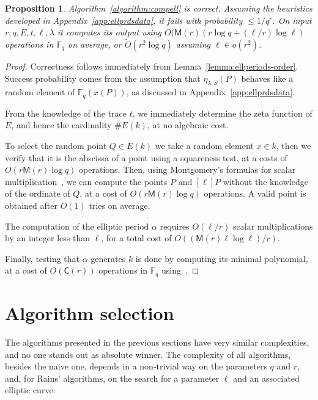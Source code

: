 \documentclass[12pt]{article}
\theoremstyle{plain}
\newtheorem{proposition}[theorem]{Proposition}
\theoremstyle{definition}
\newcommand{\tildO}{\tilde{O}}
\def\F{\ensuremath{\mathbb{F}}}
\def\MM{\ensuremath{\mathsf{M}}}
\def\CC{\ensuremath{\mathsf{C}}}
\newcounter{algorithm}
\begin{document}
\begin{proposition}
  Algorithm~\ref{algorithm:compell} is correct. Assuming the
  heuristics developed in Appendix~\ref{app:ellprdsdata}, it fails
  with probability $\le 1/q^r$.  On input
  $r,q,E,t,\ell,\lambda$ it computes its output using
  $O(\MM(r)(r\log{q} + (\ell/r)\log{\ell})$ operations in $\F_q$ on average, or
  $\tildO(r^2\log q)$ assuming $\ell\in o(r^2)$.
\end{proposition}
\begin{proof}
  Correctness follows immediately from
  Lemma~\ref{lemma:ellperiods-order}. Success probability comes from
  the assumption that $\eta_{\lambda,S}(P)$ behaves like a random element of
  $\F_q(x(P))$, as discussed in Appendix~\ref{app:ellprdsdata}.

  From the knowledge of the trace $t$, we immediately determine the
  zeta function of $E$, and hence the cardinality $\# E(k)$, at
  no algebraic cost.

  To select the random point $Q\in E(k)$ we take a random
  element $x\in k$, then we verify that it is the abscissa of a
  point using a squareness test, at a costs of $O(r\MM(r)\log q)$
  operations. Then, using Montgomery's formulas for scalar
  multiplication~\cite{montgomery}, we can compute the points $P$ and
  $[\ell]P$ without the knowledge of the ordinate of $Q$, at a cost of
  $O(r\MM(r)\log q)$ operations. A valid point is obtained after
  $O(1)$ tries on average.

  The computation of the elliptic period $\alpha$ requires $O(\ell/r)$ scalar
  multiplications by an integer less than $\ell$, for a total cost of
  $O((\MM(r)\ell\log\ell)/r)$.

  Finally, testing that $\alpha$ generates $k$ is done by computing
  its minimal polynomial, at a cost of $O(\CC(r))$ operations in
  $\F_q$ using~\cite{shoup93}.
\end{proof}


\section{Algorithm selection}
\label{sec:selection}

The algorithms presented in the previous sections have very similar
complexities, and no one stands out as absolute winner. The complexity
of all algorithms, besides the naive one, depends in a non-trivial way
on the parameters $q$ and $r$, and, for Rains' algorithms, on the
search for a parameter $\ell$ and an associated elliptic curve.
\end{document}
